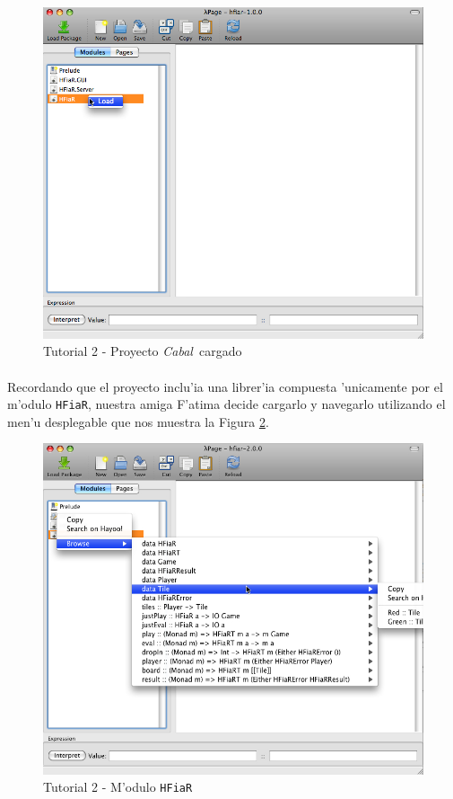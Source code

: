 \documentclass[a4paper]{article}
\newcommand{\cabal}{\textsl{Cabal}}
\begin{document}
\begin{figure}[hp]
	\begin{center}
        	\includegraphics[width=.75\textwidth]{pictures/tut2/03}
		\caption{Tutorial 2 - Proyecto \cabal\ cargado}
		\label{tut203}
	\end{center}
\end{figure}

\newpage
\paragraph{}Recordando que el proyecto inclu'ia una librer'ia compuesta 'unicamente por el m'odulo \texttt{HFiaR}, nuestra amiga F'atima decide cargarlo y navegarlo utilizando el men'u desplegable que nos muestra la Figura \ref{tut204}.
\begin{figure}[hp]
	\begin{center}
        	\includegraphics[width=.75\textwidth]{pictures/tut2/04}
		\caption{Tutorial 2 - M'odulo \texttt{HFiaR}}
		\label{tut204}
	\end{center}
\end{figure}
\end{document}
